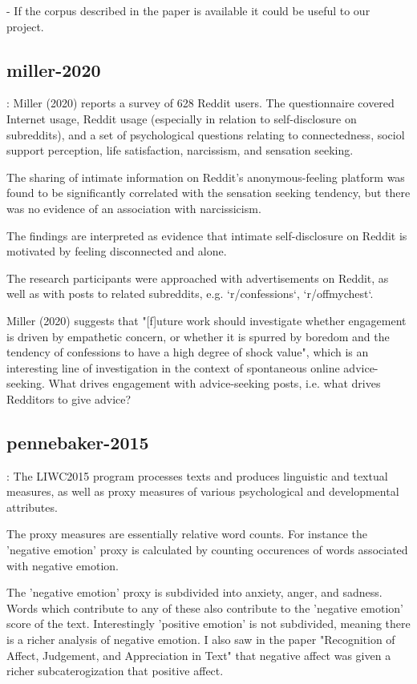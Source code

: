 - If the corpus described in the paper is available it could be useful to our project.

\subsection{miller-2020}
\cite{miller-2020}: Miller (2020) reports a survey of 628 Reddit users. The questionnaire covered Internet usage, Reddit usage (especially in relation to self-disclosure on subreddits), and a set of psychological questions relating to connectedness, sociol support perception, life satisfaction, narcissism, and sensation seeking.

The sharing of intimate information on Reddit's anonymous-feeling platform was found to be significantly correlated with the sensation seeking tendency, but there was no evidence of an association with narcissicism.

The findings are interpreted as evidence that intimate self-disclosure on Reddit is motivated by feeling disconnected and alone.

The research participants were approached with advertisements on Reddit, as well as with posts to related subreddits, e.g. `r/confessions`, `r/offmychest`.

Miller (2020) suggests that "[f]uture work should investigate whether engagement is driven by empathetic concern, or whether it is spurred by boredom and the tendency of confessions to have a high degree of shock value", which is an interesting line of investigation in the context of spontaneous online advice-seeking. What drives engagement with advice-seeking posts, i.e. what drives Redditors to give advice?


\subsection{pennebaker-2015}
\cite{pennebaker-2015}:
The LIWC2015 program processes texts and produces
linguistic and textual measures, as well as proxy measures
of various psychological and developmental attributes.

The proxy measures are essentially relative word counts.
For instance the 'negative emotion' proxy is calculated by
counting occurences of words associated with negative emotion.

The 'negative emotion' proxy is subdivided into anxiety, anger, and sadness.
Words which contribute to any of these also contribute to the 'negative emotion' score of the text.
Interestingly 'positive emotion' is not subdivided, meaning there is a richer
analysis of negative emotion. I also saw in the paper "Recognition of Affect, Judgement, and Appreciation in Text"
that negative affect was given a richer subcaterogization that positive affect.

